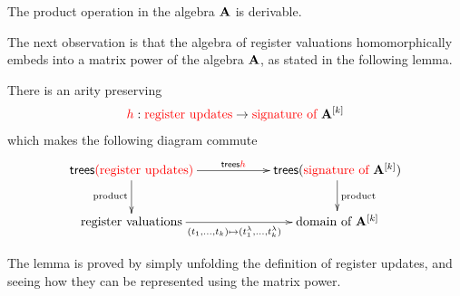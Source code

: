 \begin{corollary}\label{lem:balg}
    The product operation in the  algebra ${\color{black}\mathbf A}$ is derivable.
\end{corollary}

The next  observation is that the algebra of register valuations homomorphically embeds into a matrix power of the algebra ${\color{black}\mathbf A}$, as stated in the following lemma. 
\begin{lemma}\label{lem:hom-matrix}
    There is an arity preserving 
    \begin{align*}
    {\color{red}{h}} : {\color{red}{\text{register updates}}} \to {\color{red}{\text{signature of }}}{\color{black}\mathbf A}^{[k]}
    \end{align*}
    which makes the following diagram commute
    \begin{align*}
    \xymatrix@C=2cm{
        \treepar {\regups} \ar[r]^-{\trees \ranked h}\ar[d]_{\text{product}} & \trees (\algops {\alg^{[k]}})\ar[d]^{\text{product}} \\
        \regvalss \ar[r]_{(t_1,\ldots,t_k) \mapsto (t^\lambda_1,\ldots,t^\lambda_k)}& \algdom {\alg^{[k]}}
    }
    \end{align*} 
\end{lemma}
The lemma is proved by simply unfolding the definition of register updates, and seeing how they can be represented using the matrix power.




